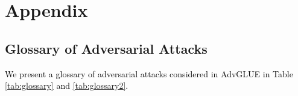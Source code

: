 \documentclass{article}
\newcommand{\method}{AdvGLUE\xspace}
\newcommand{\m}[1]{{\textcolor{black}{{#1}}}}
\begin{document}


















\clearpage


\appendix

\section{Appendix}

\subsection{Glossary of Adversarial Attacks}

\m{We present a glossary of adversarial attacks considered in \method in Table \ref{tab:glossary} and \ref{tab:glossary2}.}
\end{document}
